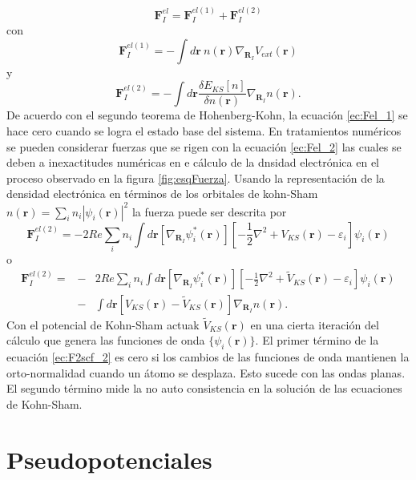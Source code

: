 \documentclass[12pt,a4paper, oneside]{book}
\begin{document}
   \begin{equation}
   \pmb{F}_I^{el} = \pmb{F}_I^{el (1)} + \pmb{F}_I^{el (2)} \label{ec:descFel}
   \end{equation} 
   con
   \begin{equation}
   \pmb{F}_I^{el (1)} = - \int d \pmb{r} ~n(\pmb{r}) \nabla_{\pmb{R}_I} V_{ext} (\pmb{r}) \label{ec:Fel_1}
   \end{equation}
   y
   \begin{equation}
   \pmb{F}_I^{el(2)} = - \int d \pmb{r} \frac{\delta E_{KS} [n]}{\delta n(\pmb{r})} \nabla_{\pmb{R}_I} n(\pmb{r}). \label{ec:Fel_2} 
   \end{equation}
   De acuerdo con el segundo teorema de Hohenberg-Kohn, la ecuaci\'on \ref{ec:Fel_1} se hace cero cuando se logra el estado base del sistema. En tratamientos num\'ericos se pueden considerar fuerzas que se rigen con la ecuaci\'on \ref{ec:Fel_2} las cuales se deben a inexactitudes num\'ericas en e c\'alculo de la dnsidad electr\'onica en el proceso observado en la figura \ref{fig:esqFuerza}. Usando la representaci\'on de la densidad electr\'onica en t\'erminos de los orbitales de kohn-Sham $n(\pmb{r}) = \sum_i n_i |\psi_i (\pmb{r})|^2 $ la fuerza puede ser descrita por
   \begin{equation}
   \pmb{F}_I^{el(2)} = -2 Re \sum_i n_i \int d \pmb{r} [\nabla_{\pmb{R}_I} \psi_i^* (\pmb{r})] \left[-\frac{1}{2} \nabla^2 + V_{KS} (\pmb{r}) - \varepsilon_i \right] \psi_i (\pmb{r}) \label{ec:F2scf}
   \end{equation}
   o
   \begin{eqnarray}
   \pmb{F}_I^{el(2)} = &-& 2 Re \sum_i n_i \int d \pmb{r} [\nabla_{\pmb{R}_I} \psi_i^* (\pmb{r})] \left[-\frac{1}{2} \nabla^2 + \tilde{V}_{KS} (\pmb{r}) -\varepsilon_i \right] \psi_i (\pmb{r}) \nonumber\\ 
   &-& \int d\pmb{r} [V_{KS} (\pmb{r})-\tilde{V}_{KS} (\pmb{r})] \nabla_{\pmb{R}_I} n(\pmb{r}). \label{ec:F2scf_2} 
   \end{eqnarray}
   Con el potencial de Kohn-Sham actuak $\tilde{V}_{KS} (\pmb{r})$ en una cierta iteraci\'on del c\'alculo que genera las funciones de onda $\{\psi_i (\pmb{r})\}$. El primer t\'ermino de la ecuaci\'on \ref{ec:F2scf_2} es cero si los cambios de las funciones de onda mantienen la orto-normalidad cuando un \'atomo se desplaza. Esto sucede con las ondas planas. El segundo t\'ermino mide la no auto consistencia en la soluci\'on de las ecuaciones de Kohn-Sham.
      
   \section{Pseudopotenciales}\label{sec:pseudo}
\end{document}

